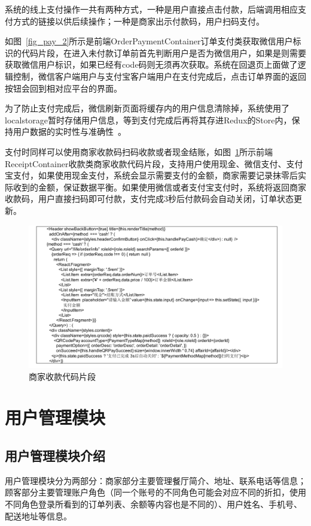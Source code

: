 系统的线上支付操作一共有两种方式，一种是用户直接点击付款，后端调用相应支付方式的链接以供后续操作；一种是商家出示付款码，用户扫码支付。

如图~\ref{fig_pay_2}所示是前端OrderPaymentContainer订单支付类获取微信用户标识的代码片段，在进入未付款订单前首先判断用户是否为微信用户，如果是则需要获取微信用户标识，如果已经有code码则无须再次获取。系统在回退页上面做了逻辑控制，微信客户端用户与支付宝客户端用户在支付完成后，点击订单界面的返回按钮会回到相对应平台的界面。

为了防止支付完成后，微信刷新页面将缓存内的用户信息清除掉，系统使用了localstorage暂时存储用户信息，等到支付完成后再将其存进Redux的Store内，保持用户数据的实时性与准确性~\cite{mys2019}。

支付时同样可以使用商家收款码扫码收款或者现金结账，如图~\ref{fig_pay_3}所示前端ReceiptContainer收款类商家收款代码片段，支持用户使用现金、微信支付、支付宝支付，如果使用现金支付，系统会显示需要支付的金额，商家需要记录抹零后实际收到的金额，保证数据平衡。如果使用微信或者支付宝支付时，系统将返回商家收款码，用户直接扫码即可付款，支付完成3秒后付款码会自动关闭，订单状态更新。\\

\begin{figure}[htbp!]
    \centering
    \includegraphics[width=\linewidth]{FIGs/chapter4/3.pdf}
    \caption{商家收款代码片段}\label{fig_pay_3}
\end{figure}

\section{用户管理模块}
\subsection{用户管理模块介绍}
用户管理模块分为两部分：商家部分主要管理餐厅简介、地址、联系电话等信息；顾客部分主要管理账户角色（同一个账号的不同角色可能会对应不同的折扣，使用不同角色登录所看到的订单列表、余额等内容也是不同的）、用户姓名、手机号、配送地址等信息。\\

